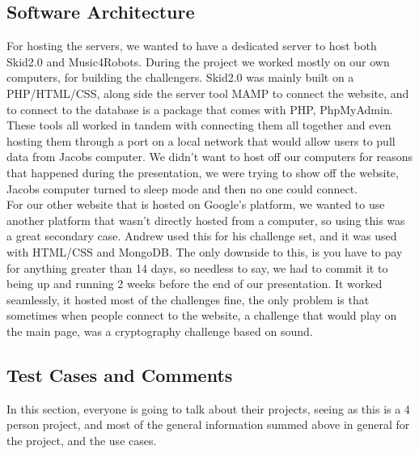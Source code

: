 \documentclass[runningheads,a4paper]{llncs}
\begin{document}
\subsection{Software Architecture}
 For hosting the servers, we wanted to have a dedicated server to host both Skid2.0 and Music4Robots. During the project we worked mostly on our own computers, for building the challengers. Skid2.0 was mainly built on a PHP/HTML/CSS, along side the  server tool MAMP to connect the website, and to connect to the database is a package that comes with PHP, PhpMyAdmin. These tools all worked in tandem with connecting them all together and even hosting them through a port on a local network that would allow users to pull data from Jacobs computer. We didn’t want to host off our computers for reasons that happened during the presentation, we were trying to show off the website, Jacobs computer turned to sleep mode and then no one could connect. \\
For our other website that is hosted on Google’s platform, we wanted to use another platform that wasn’t directly hosted from a computer, so using this was a great secondary case. Andrew used this for his challenge set, and it was used with HTML/CSS and MongoDB. The only downside to this, is you have to pay for anything greater than 14 days, so needless to say, we had to commit it to being up and running 2 weeks before the end of our presentation. It worked seamlessly, it hosted most of the challenges fine, the only problem is that sometimes when people connect to the website, a challenge that would play on the main page, was a cryptography challenge based on sound.

\subsection{Test Cases and Comments}
In this section, everyone is going to talk about their projects, seeing as this is a 4 person project, and most of the general information summed above in general for the project, and the use cases.
\end{document}
